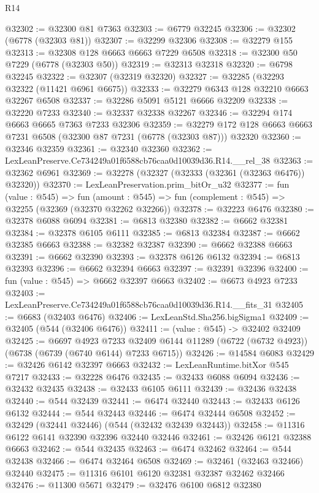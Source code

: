\begin{lexlean}{R14}
\begin{coremodule}
@32302 := @32300 @81 @7363
@32303 := @6779 @32245
@32306 := @32302 (@6778 (@32303 @81))
@32307 := @32299 @32306
@32308 := @32279 @155
@32313 := @32308 @128 @6663 @6663 @7229 @6508
@32318 := @32300 @50 @7229 (@6778 (@32303 @50))
@32319 := @32313 @32318
@32320 := @6798 @32245
@32322 := @32307 (@32319 @32320)
@32327 := @32285 (@32293 @32322 (@11421 @6961 @6675))
@32333 := @32279 @6343 @128 @32210 @6663 @32267 @6508
@32337 := @32286 @5091 @5121 @6666 @32209
@32338 := @32220 @7233
@32340 := @32337 @32338 @32267
@32346 := @32294 @174 @6663 @6665 @7363 @7233 @32306
@32359 := @32279 @172 @128 @6663 @6663 @7231 @6508 (@32300 @87 @7231 (@6778 (@32303 @87))) @32320
@32360 := @32346 @32359
@32361 := @32340 @32360
@32362 := LexLeanPreserve.Ce734249a01f6588cb76caa0d10039d36.R14.__rel_38
@32363 := @32362 @6961
@32369 := @32278 (@32327 (@32333 (@32361 (@32363 @6476)) @32320))
@32370 := LexLeanPreservation.prim_bitOr_u32
@32377 := fun (value : @545) =>
  fun (amount : @545) => fun (complement : @545) => @32255 (@32369 (@32370 @32262 @32266))
@32378 := @32223 @6476
@32380 := @32378 @6088 @6094
@32381 := @6813 @32380
@32382 := @6662 @32381
@32384 := @32378 @6105 @6111
@32385 := @6813 @32384
@32387 := @6662 @32385 @6663
@32388 := @32382 @32387
@32390 := @6662 @32388 @6663
@32391 := @6662 @32390
@32393 := @32378 @6126 @6132
@32394 := @6813 @32393
@32396 := @6662 @32394 @6663
@32397 := @32391 @32396
@32400 := fun (value : @545) => @6662 @32397 @6663
@32402 := @6673 @4923 @7233
@32403 := LexLeanPreserve.Ce734249a01f6588cb76caa0d10039d36.R14.__fits_31
@32405 := @6683 (@32403 @6476)
@32406 := LexLeanStd.Sha256.bigSigma1
@32409 := @32405 (@544 (@32406 @6476))
@32411 := (value : @545) -> @32402 @32409
@32425 := @6697
    @4923
    @7233
    @32409
    @6144
    @11289
    (@6722 (@6732 @4923))
    (@6738 (@6739 (@6740 @6144) @7233 @6715))
@32426 := @14584 @6083
@32429 := @32426 @6142 @32397 @6663
@32432 := LexLeanRuntime.bitXor @545 @7217
@32433 := @32228 @6476
@32435 := @32433 @6088 @6094
@32436 := @32432 @32435
@32438 := @32433 @6105 @6111
@32439 := @32436 @32438
@32440 := @544 @32439
@32441 := @6474 @32440
@32443 := @32433 @6126 @6132
@32444 := @544 @32443
@32446 := @6474 @32444 @6508
@32452 := @32429 (@32441 @32446) (@544 (@32432 @32439 @32443))
@32458 := @11316 @6122 @6141 @32390 @32396 @32440 @32446
@32461 := @32426 @6121 @32388 @6663
@32462 := @544 @32435
@32463 := @6474 @32462
@32464 := @544 @32438
@32466 := @6474 @32464 @6508
@32469 := @32461 (@32463 @32466) @32440
@32475 := @11316 @6101 @6120 @32381 @32387 @32462 @32466
@32476 := @11300 @5671
@32479 := @32476 @6100 @6812 @32380

\end{coremodule}
\end{lexlean}
